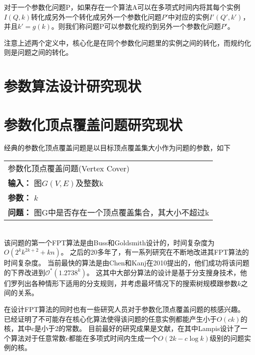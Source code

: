 \begin{definition}
对于一个参数化问题P，如果存在一个算法A可以在多项式时间内将其每个实例$I(Q, k)$转化成另外一个转化成另外一个参数化问题$P'$中对应的实例$I'(Q', k')$，
并且$k' = g(k)$。则我们称问题P可以参数化规约到另外一个参数化问题$P'$。
\end{definition}

注意上述两个定义中，核心化是在同个参数化问题里的实例之间的转化，而规约化则是问题之间的转化。
\section{参数算法设计研究现状}

\section{参数化顶点覆盖问题研究现状}
经典的参数化顶点覆盖问题是以目标顶点覆盖集大小作为问题的参数，如下 \\

\begin{tabular}{| p{0.9\headwidth} |}
  \hline
  参数化顶点覆盖问题(Vertex Cover) \\
  \textbf{输入：} 图$G(V, E)$及整数k \\
  \textbf{参数：} $k$\\
  \textbf{问题：} 图G中是否存在一个顶点覆盖集合，其大小不超过k\\
  \hline
\end{tabular} \vspace{0.5cm} \\

该问题的第一个FPT算法是由Buss和Goldsmith设计的，时间复杂度为$O(2^kk^{2k+2} + kn)$。
之后的20多年了，有一系列研究在不断地改进其FPT算法的时间复杂度。
当前最快的算法是由Chen和Kanj在2010提出的，他们成功将该问题的下界改进到$\mathcal{O}^*(1.2738^k)$。
这其中大部分算法的设计是基于分支搜身技术，他们罗列出各种情形下适用的分支规则，并考虑最坏情况下的搜索树规模跟参数$k$之间的关系。

在设计FPT算法的同时也有一些研究人员对于参数化顶点覆盖问题的核感兴趣。
已经证明了不可能存在核心化算法使得该问题的任意实例都能产生小于$O(ck)$的核，其中c是小于2的常数。
目前最好的研究成果是文献\cite{lampis2011kernel}，在其中Lampis设计了一个算法对于任意常数c都能在多项式时间内生成一个$O(2k - c \log k)$级别的问题实例的核。

